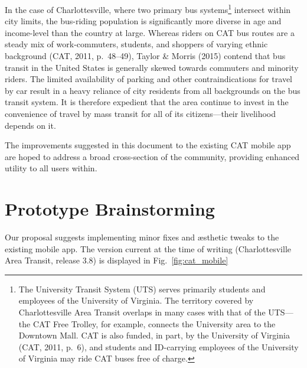 \documentclass[12pt,letterpaper]{article}
\begin{document}
In the case of Charlottesville, where two primary bus
systems\footnote{The University Transit System (UTS) serves primarily students
and employees of the University of Virginia. The territory covered by
Charlottesville Area Transit overlaps in many cases with that of the UTS---the
CAT Free Trolley, for example, connects the University area to the Downtown
Mall. CAT is also funded, in part, by the University of Virginia (CAT, 2011,
p.~6), and students and ID-carrying employees of the University of Virginia may
ride CAT buses free of charge.} intersect within city limits, the bus-riding
population is significantly more diverse in age and income-level than the country at large.
Whereas riders on CAT bus routes are a steady mix of work-commuters, students,
and shoppers of varying ethnic background (CAT, 2011, p.~48--49), Taylor \&
Morris (2015) contend that bus transit in the United States is generally skewed
towards commuters and minority riders. The limited availability of parking and
other contraindications for travel by car result in a heavy reliance of city
residents from all backgrounds on the bus transit system. It is therefore expedient that
the area continue to invest in the convenience of travel by mass transit for all of
its citizens---their livelihood depends on it.

The improvements suggested in this document to the existing CAT mobile app are hoped to address a broad cross-section
of the community, providing enhanced utility to all users within.

\section{Prototype Brainstorming}
Our proposal suggests implementing minor fixes and \ae{}sthetic tweaks to the existing mobile app. The version current at the time of writing (Charlottesville Area Transit, release 3.8) is displayed in Fig.~\ref{fig:cat_mobile}
\end{document}

